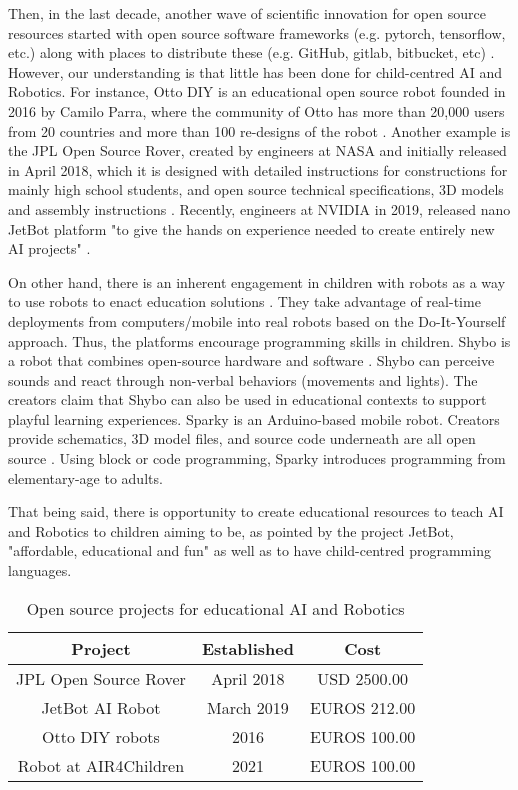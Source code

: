 \documentclass[sigconf]{acmart}
\begin{document}
Then, in the last decade, another wave of scientific innovation for open source resources started with open source software frameworks (e.g. pytorch, tensorflow, etc.) along with places to distribute these (e.g. GitHub, gitlab, bitbucket, etc) \cite{matelabs2017}.
However, our understanding is that little has been done for child-centred AI and Robotics. 
For instance, Otto DIY is an educational open source robot founded in 2016 by Camilo Parra, where the community of Otto has more than 20,000 users from 20 countries and more than 100 re-designs of the robot \cite{OttoDIY:2016}.
Another example is the JPL Open Source Rover, created by engineers at NASA and initially released in April 2018, which it is designed with detailed instructions for constructions for mainly high school students, and open source technical specifications, 3D models and assembly instructions \cite{OSR:2018}.
Recently, engineers at NVIDIA in 2019, released nano JetBot platform  "to give the hands on experience needed to create entirely new AI projects" \cite{nanoJetBot:2019}. 

On other hand, there is an inherent engagement in children with robots as a way to use robots to enact education solutions \cite{druga2019}. 
They take advantage of real-time deployments from computers/mobile into real robots based on the Do-It-Yourself approach. 
Thus, the platforms encourage programming skills in children. 
Shybo is a robot that combines open-source hardware and software \cite{Lupetti2017}.
Shybo can perceive sounds and react through non-verbal behaviors (movements and lights). 
The creators claim that Shybo can also be used in educational contexts to support playful learning experiences. 
Sparky is an Arduino-based mobile robot. Creators provide schematics, 3D model files, and source code underneath are all open source \cite{sparky2012}. 
Using block or code programming, Sparky introduces programming from elementary-age to adults.

That being said, there is opportunity to create educational resources to teach AI and Robotics to children aiming to be, as pointed by the project JetBot, "affordable, educational and fun" \cite{nanoJetBot:2019} as well as to have child-centred programming languages.

\begin{table}
  \begin{tabular}{ccc}
    \toprule
    Project & Established  & Cost\\
    \midrule
    JPL Open Source Rover \cite{OSR:2018} & April 2018  &  USD 2500.00 \\
    JetBot AI Robot \cite{nanoJetBot:2019} & March 2019  & EUROS 212.00    \\
    Otto DIY robots \cite{OttoDIY:2016} & 2016 &  EUROS 100.00  \\
    Robot at AIR4Children & 2021 & EUROS 100.00  \\
  \bottomrule
\end{tabular}
\caption{Open source projects for educational AI and Robotics}
\label{tab:opensourceprojects}
\end{table}
\end{document}
